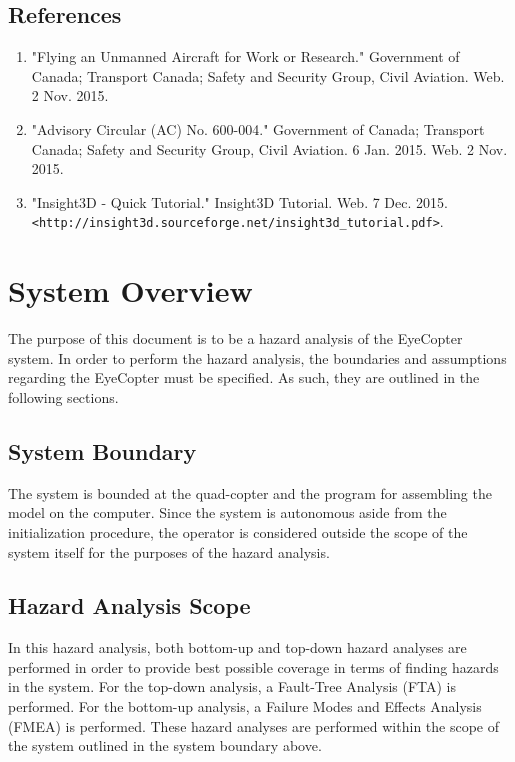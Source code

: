 \documentclass[10pt,letterpaper]{article}
\begin{document}
\newpage


\subsection{References}
\begin{enumerate}
	\item "Flying an Unmanned Aircraft for Work or Research." Government of Canada; Transport Canada; Safety and Security Group, Civil Aviation. Web. 2 Nov. 2015.
	\item "Advisory Circular (AC) No. 600-004." Government of Canada; Transport Canada; Safety and Security Group, Civil Aviation. 6 Jan. 2015. Web. 2 Nov. 2015.
    \item "Insight3D - Quick Tutorial." Insight3D Tutorial. Web. 7 Dec. 2015. \texttt{<http://insight3d.sourceforge.net/insight3d\_tutorial.pdf>}.
\end{enumerate}


\newpage


\section{System Overview}
The purpose of this document is to be a hazard analysis of the EyeCopter system. In order to perform the hazard analysis, the boundaries and assumptions regarding the EyeCopter must be specified. As such, they are outlined in the following sections.

\subsection{System Boundary}
The system is bounded at the quad-copter and the program for assembling the model on the computer. Since the system is autonomous aside from the initialization procedure, the operator is considered outside the scope of the system itself for the purposes of the hazard analysis. 

\subsection{Hazard Analysis Scope}
In this hazard analysis, both bottom-up and top-down hazard analyses are performed in order to provide best possible coverage in terms of finding hazards in the system. For the top-down analysis, a Fault-Tree Analysis (FTA) is performed. For the bottom-up analysis, a Failure Modes and Effects Analysis (FMEA) is performed. These hazard analyses are performed within the scope of the system outlined in the system boundary above.
\end{document}
